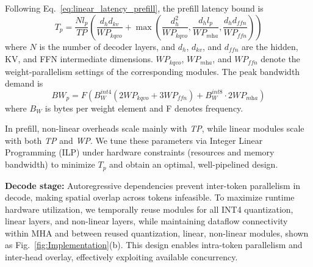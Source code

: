 \documentclass[conference]{IEEEtran}
\begin{document}
Following Eq.~\ref{eq:linear_latency_prefill}, the prefill latency bound is
\begin{equation} \label{eq:prefill_latency}
    T_{p} = 
\frac{Nl_{p}}{\textit{TP}} ( 
\frac{d_{h}d_{\textit{kv}}}{\textit{WP}_{\textit{kqvo}}} + 
\max( 
\frac{d_{h}^2}{\textit{WP}_{\textit{kqvo}}}, 
\frac{d_{h}l_{p}}{\textit{WP}_{\textit{mha}}}, 
\frac{d_{h}d_{\textit{ffn}}}{\textit{WP}_{\textit{ffn}}}))
\end{equation}
where $N$ is the number of decoder layers, and $d_h$, $d_{\textit{kv}}$, and $d_{\textit{ffn}}$ are the hidden, KV, and FFN intermediate dimensions. $\textit{WP}_{\textit{kqvo}}$, $\textit{WP}_{\textit{mha}}$, and $\textit{WP}_{\textit{ffn}}$ denote the weight-parallelism settings of the corresponding modules. The peak bandwidth demand is
\begin{equation}\label{eq:prefill_bandwidth}
BW_{p}=F\!\left(B_W^{\textit{int4}}\!\left(2\textit{WP}_{\textit{kqvo}}+3\textit{WP}_{\textit{ffn}}\right)+B_W^{\textit{int8}}\cdot 2\textit{WP}_{\textit{mha}}\right)
\end{equation}
where $B_W$ is bytes per weight element and F denotes frequency.

In prefill, non-linear overheads scale mainly with \textit{TP}, while linear modules scale with both \textit{TP} and \textit{WP}. We tune these parameters via Integer Linear Programming (ILP) under hardware constraints (resources and memory bandwidth) to minimize $T_{p}$ and obtain an optimal, well-pipelined design.

\textbf{Decode stage:}  Autoregressive dependencies prevent inter-token parallelism in decode, making spatial overlap across tokens infeasible. To maximize runtime hardware utilization, we temporally reuse modules for all INT4 quantization, linear layers, and non-linear layers, while maintaining dataflow connectivity within MHA and between reused quantization, linear, non-linear modules, shown as Fig.~\ref{fig:Implementation}(b). This design enables intra-token parallelism and inter-head overlay, effectively exploiting available concurrency.
\end{document}
